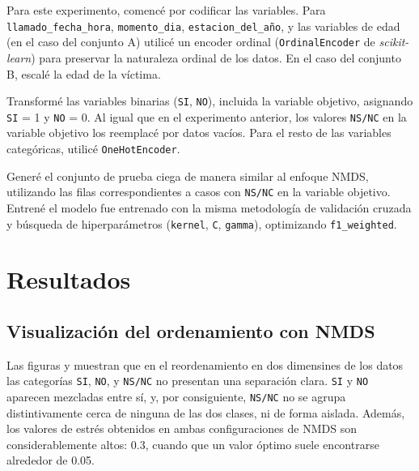 \documentclass[10 pt]{article}
\begin{document}
Para este experimento, comencé por codificar las variables. Para \texttt{llamado\_fecha\_hora}, \texttt{momento\_dia}, \texttt{estacion\_del\_año}, y las variables de edad (en el caso del conjunto A) utilicé un encoder ordinal (\texttt{OrdinalEncoder} de \textit{scikit-learn}\citetext{\citealp{scikit-learn}}) para preservar la naturaleza ordinal de los datos. En el caso del conjunto B, escalé la edad de la víctima.

Transformé las variables binarias (\texttt{SI}, \texttt{NO}), incluida la variable objetivo, asignando \texttt{SI} = 1 y \texttt{NO} = 0. Al igual que en el experimento anterior, los valores \texttt{NS/NC} en la variable objetivo los reemplacé por datos vacíos. Para el resto de las variables categóricas, utilicé \texttt{OneHotEncoder}.

Generé el conjunto de prueba ciega  de manera similar al enfoque NMDS, utilizando las filas correspondientes a casos con \texttt{NS/NC} en la variable objetivo. Entrené el modelo fue entrenado con la misma metodología de validación cruzada y búsqueda de hiperparámetros (\texttt{kernel}, \texttt{C}, \texttt{gamma}), optimizando \texttt{f1\_weighted}.


\section{Resultados}\label{resultados}

\subsection{Visualización del ordenamiento con NMDS}

Las figuras  y  muestran que en el reordenamiento en dos dimensines de los datos las categorías \texttt{SI}, \texttt{NO}, y \texttt{NS/NC} no presentan una separación clara. \texttt{SI} y \texttt{NO} aparecen mezcladas entre sí, y, por consiguiente, \texttt{NS/NC} no se agrupa distintivamente cerca de ninguna de las dos clases, ni de forma aislada. Además, los valores de estrés obtenidos en ambas configuraciones de NMDS son considerablemente altos: 0.3, cuando que un valor óptimo suele encontrarse alrededor de 0.05. 
\end{document}

